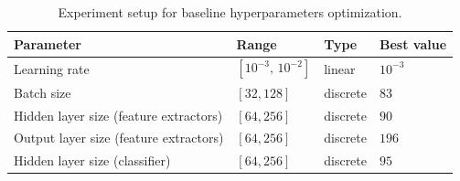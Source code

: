 \documentclass[runningheads]{llncs}
\begin{document}
\begin{table}[t]
	\centering
	\caption{Experiment setup for baseline hyperparameters optimization.}
	\label{tab:baseline_hpo}
	\begin{tabular}{p{6cm}p{2cm}p{1.5cm}l}
		\hline
		\textbf{Parameter}                     & \textbf{Range}        & \textbf{Type} & \textbf{Best value} \\
		\hline
		Learning rate                          & $[10^{-3},\,10^{-2}]$ & linear        & $10^{-3}$           \\
		Batch size                             & $[32, 128]$           & discrete      & $83$                \\
		Hidden layer size (feature extractors) & $[64, 256]$           & discrete      & $90$                \\
		Output layer size (feature extractors) & $[64, 256]$           & discrete      & $196$               \\
		Hidden layer size (classifier)         & $[64, 256]$           & discrete      & $95$                \\
		\hline
	\end{tabular}
\end{table}
\end{document}
